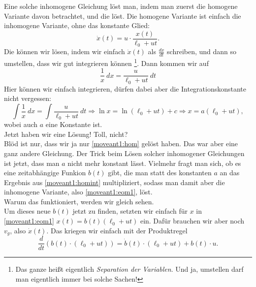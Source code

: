 \begin{Answer}[ref = moveant]
	Eine solche inhomogene Gleichung löst man, indem man zuerst die homogene Variante davon betrachtet, und die löst. Die homogene Variante ist einfach die inhomogene Variante, ohne das konstante Glied:
	\begin{equation}\label{moveant1:hom}
		\dot{x}\left(t\right) = u\cdot \frac{x\left(t\right)}{\ell_0 + u t}.
	\end{equation}
	Die können wir lösen, indem wir einfach $\dot{x}\left(t\right)$ als $\frac{dx}{dt}$ schreiben, und dann so \glqq umstellen\grqq, dass wir gut integrieren können \footnote{Das ganze heißt eigentlich \textit{Separation der Variablen}. Und ja, umstellen darf man eigentlich immer bei solche Sachen!}. Dann kommen wir auf
	\begin{equation*}
		\frac{1}{x}~dx = \frac{u}{\ell_0 + u t}~dt
	\end{equation*}
	Hier können wir einfach integrieren, dürfen dabei aber die Integrationskonstante nicht vergessen:
	\begin{equation}\label{moveant1:homint}
		\int \frac{1}{x}~dx = \int \frac{u}{\ell_0+ut}~dt \Rightarrow \ln x = \ln \left(\ell_0 + ut\right) +c \Rightarrow x = a \left(\ell_0 + u t\right),
	\end{equation}
	wobei auch $a$ eine Konstante ist.\\
	Jetzt haben wir eine Lösung! Toll, nicht?\\
	Blöd ist nur, dass wir ja nur \eqref{moveant1:hom} gelöst haben. Das war aber eine ganz andere Gleichung. Der Trick beim Lösen solcher inhomogener Gleichungen ist jetzt, dass man $a$ nicht mehr konstant lässt. Vielmehr fragt man sich, ob es eine zeitabhängige Funkion $b\left(t\right)$ gibt, die man statt des konstanten $a$ an das Ergebnis aus \eqref{moveant1:homint} multipliziert, sodass man damit aber die inhomogene Variante, also \eqref{moveant1:eom1}, löst.\\
	Warum das funktioniert, werden wir gleich sehen.\\
	Um dieses neue $b\left(t\right)$ jetzt zu finden, setzten wir einfach für $x$ in \eqref{moveant1:eom1} $x\left(t\right) = b\left(t\right) \left(\ell_0 + u t\right) $ ein. Dafür brauchen wir aber noch $v_g$, also $\dot{x}\left(t\right)$. Das kriegen wir einfach mit der Produktregel
	\begin{equation}\label{moveant1:prodrule}
		\frac{d}{dt}\left(b\left(t\right)\cdot\left(\ell_0 + u t\right)\right) = \dot{b} \left(t\right)\cdot  \left(\ell_0 + u t\right)  + b\left(t\right)  \cdot u.
	\end{equation}

\end{Answer}
